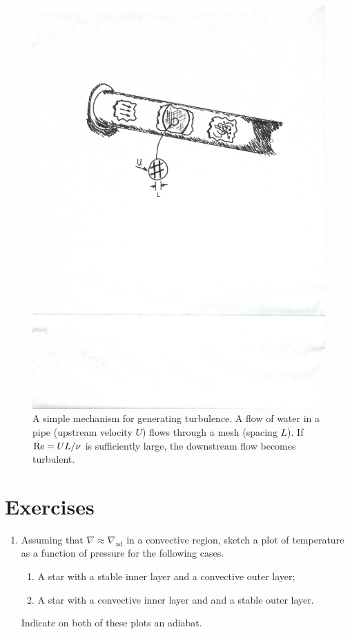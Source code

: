 \begin{figure}[htbp]
\includegraphics[width=\textwidth]{turbulence-maker}
\caption{\label{f.turbulence} A simple mechanism for generating turbulence. A flow of water in a pipe (upstream velocity $U$) flows through a mesh (spacing $L$).  If $\mathrm{Re} = UL/\nu$ is sufficiently large, the downstream flow becomes turbulent. }
\end{figure}

\section{Exercises}
\begin{enumerate}
\item Assuming that $\nabla \approx \nabla_{\mathrm{ad}}$ in a convective region, sketch a plot of temperature as a function of pressure for the following cases.
\begin{enumerate}
\item A star with a stable inner layer and a convective outer layer;
\item A star with a convective inner layer and and a stable outer layer.
\end{enumerate}
Indicate on both of these plots an adiabat.
\end{enumerate}